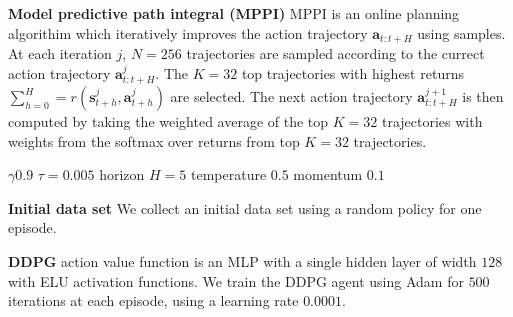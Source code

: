 \documentclass{article}
\newcommand{\state}{\ensuremath{\mathbf{s}}}
\newcommand{\action}{\ensuremath{\mathbf{a}}}
\begin{document}
\textbf{Model predictive path integral (MPPI)}
MPPI is an online planning algorithim which iteratively improves the action trajectory $\action_{t:t+H}$ using samples.
At each iteration $j$, $N=256$ trajectories are sampled according to the currect action trajectory $\action^{j}_{t:t+H}$.
The $K=32$ top trajectories with highest returns $\sum_{h=0}^{H} = r(\state^{j}_{t+h}, \action^{j}_{t+h})$ are selected.
The next action trajectory $\action^{j+1}_{t:t+H}$ is then computed by taking the weighted average of the top $K=32$ trajectories
with weights from the softmax over returns from top $K=32$ trajectories.

$\gamma 0.9$
$\tau=0.005$
horizon $H=5$
temperature $0.5$
momentum $0.1$

\textbf{Initial data set}
We collect an initial data set using a random policy for one episode.

\textbf{DDPG}
action value function is an MLP with a single hidden layer of width $128$ with ELU activation functions.
We train the DDPG agent using Adam for $500$ iterations at each episode, using a learning rate $0.0001$.
\end{document}
